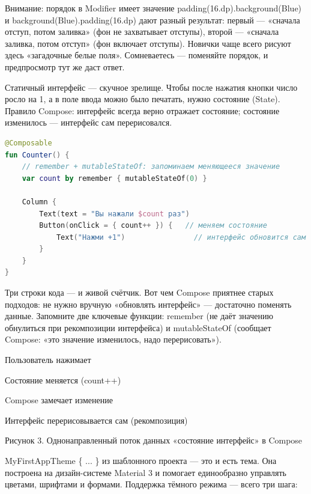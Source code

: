 \begin{tcbwarn}{Внимание: порядок в Modifier имеет значение}
padding(16.dp).background(Blue) и background(Blue).padding(16.dp) дают разный результат: первый — «сначала отступ, потом заливка» (фон не захватывает отступы), второй — «сначала заливка, потом отступ» (фон включает отступы). Новички чаще всего рисуют здесь «загадочные белые поля». Сомневаетесь — поменяйте порядок, и предпросмотр тут же даст ответ.

\end{tcbwarn}


Статичный интерфейс — скучное зрелище. Чтобы после нажатия кнопки число росло на 1, а в поле ввода можно было печатать, нужно состояние (State). Правило Compose: интерфейс всегда верно отражает состояние; состояние изменилось — интерфейс сам перерисовался.

\begin{lstlisting}[language=Kotlin]
@Composable
fun Counter() {
    // remember + mutableStateOf: запоминаем меняющееся значение
    var count by remember { mutableStateOf(0) }

    Column {
        Text(text = "Вы нажали $count раз")
        Button(onClick = { count++ }) {   // меняем состояние
            Text("Нажми +1")                // интерфейс обновится сам
        }
    }
}
\end{lstlisting}

Три строки кода — и живой счётчик. Вот чем Compose приятнее старых подходов: не нужно вручную «обновлять интерфейс» — достаточно поменять данные. Запомните две ключевые функции: remember (не даёт значению обнулиться при рекомпозиции интерфейса) и mutableStateOf (сообщает Compose: «это значение изменилось, надо перерисовать»).

Пользователь нажимает

Состояние меняется (count++)

Compose замечает изменение

Интерфейс перерисовывается сам (рекомпозиция)

\begin{center}\small\color{gray}Рисунок 3. Однонаправленный поток данных «состояние интерфейс» в Compose\end{center}


MyFirstAppTheme \{ ... \} из шаблонного проекта — это и есть тема. Она построена на дизайн-системе Material 3 и помогает единообразно управлять цветами, шрифтами и формами. Поддержка тёмного режима — всего три шага:

